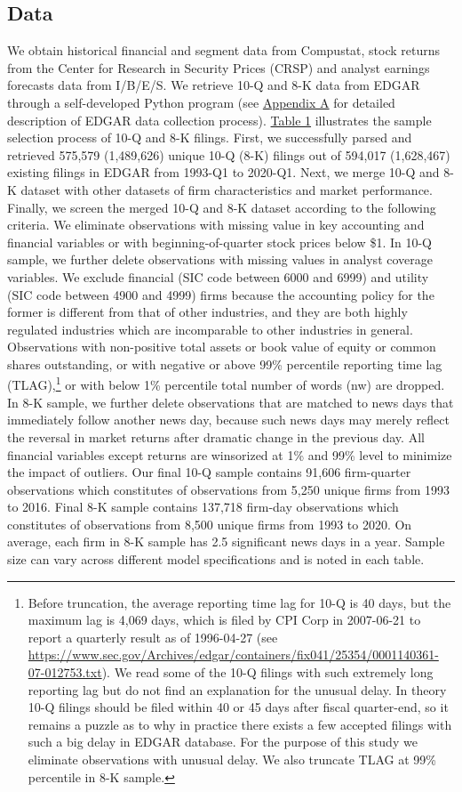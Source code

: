 \documentclass[a4paper]{article}
\begin{document}
\begin{spacing}{2}
\subsection{Data}
We obtain historical financial and segment data from Compustat, stock returns from the Center for Research in Security Prices (CRSP) and analyst earnings forecasts data from I/B/E/S. We retrieve 10-Q and 8-K data from EDGAR through a self-developed Python program (see \hyperref[appa]{Appendix A} for detailed description of EDGAR data collection process). \hyperref[T1]{Table 1} illustrates the sample selection process of 10-Q and 8-K filings. First, we successfully parsed and retrieved 575,579 (1,489,626) unique 10-Q (8-K) filings out of 594,017 (1,628,467) existing filings in EDGAR from 1993-Q1 to 2020-Q1. Next, we merge 10-Q and 8-K dataset with other datasets of firm characteristics and market performance. Finally, we screen the merged 10-Q and 8-K dataset according to the following criteria. We eliminate observations with missing value in key accounting and financial variables or with beginning-of-quarter stock prices below \$1. In 10-Q sample, we further delete observations with missing values in analyst coverage variables. We exclude financial (SIC code between 6000 and 6999) and utility (SIC code between 4900 and 4999) firms because the accounting policy for the former is different from that of other industries, and they are both highly regulated industries which are incomparable to other industries in general. Observations with non-positive total assets or book value of equity or common shares outstanding, or with negative or above 99\% percentile reporting time lag (TLAG),\footnote{Before truncation, the average reporting time lag for 10-Q is 40 days, but the maximum lag is 4,069 days, which is filed by CPI Corp in 2007-06-21 to report a quarterly result as of 1996-04-27 (see \url{https://www.sec.gov/Archives/edgar/containers/fix041/25354/0001140361-07-012753.txt}). We read some of the 10-Q filings with such extremely long reporting lag but do not find an explanation for the unusual delay. In theory 10-Q filings should be filed within 40 or 45 days after fiscal quarter-end, so it remains a puzzle as to why in practice there exists a few accepted filings with such a big delay in EDGAR database. For the purpose of this study we eliminate observations with unusual delay. We also truncate TLAG at 99\% percentile in 8-K sample.} or with below 1\% percentile total number of words (nw) are dropped. In 8-K sample, we further delete observations that are matched to news days that immediately follow another news day, because such news days may merely reflect the reversal in market returns after dramatic change in the previous day. All financial variables except returns are winsorized at 1\% and 99\% level to minimize the impact of outliers. Our final 10-Q sample contains 91,606 firm-quarter observations which constitutes of observations from 5,250 unique firms from 1993 to 2016. Final 8-K sample contains 137,718 firm-day observations which constitutes of observations from 8,500 unique firms from 1993 to 2020. On average, each firm in 8-K sample has 2.5 significant news days in a year. Sample size can vary across different model specifications and is noted in each table. 


\end{spacing}
\end{document}
